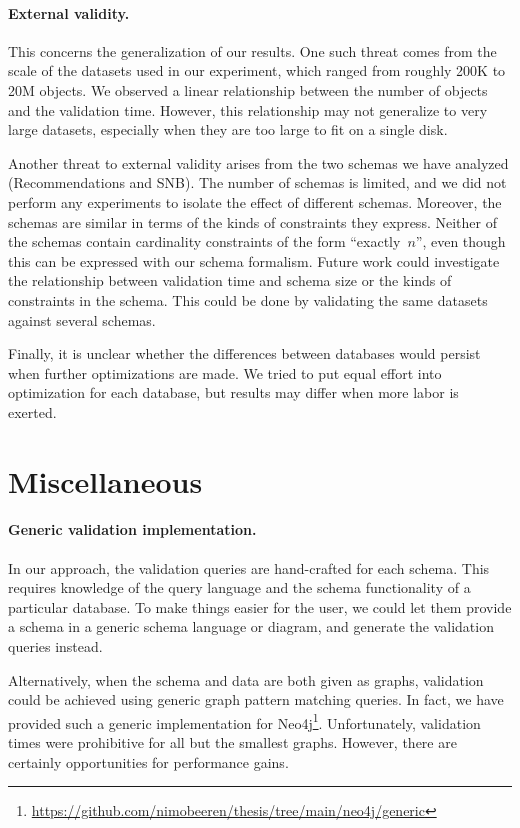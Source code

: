 \documentclass{report}
\theoremstyle{definition}
\begin{document}
\paragraph{External validity.} This concerns the generalization of our results. One such threat comes from the scale of the datasets used in our experiment, which ranged from roughly 200K to 20M objects. We observed a linear relationship between the number of objects and the validation time. However, this relationship may not generalize to very large datasets, especially when they are too large to fit on a single disk.

Another threat to external validity arises from the two schemas we have analyzed (Recommendations and SNB). The number of schemas is limited, and we did not perform any experiments to isolate the effect of different schemas. Moreover, the schemas are similar in terms of the kinds of constraints they express. Neither of the schemas contain cardinality constraints of the form ``exactly~$n$'', even though this can be expressed with our schema formalism. Future work could investigate the relationship between validation time and schema size or the kinds of constraints in the schema. This could be done by validating the same datasets against several schemas.

Finally, it is unclear whether the differences between databases would persist when further optimizations are made. We tried to put equal effort into optimization for each database, but results may differ when more labor is exerted.

\section{Miscellaneous}

\paragraph{Generic validation implementation.} In our approach, the validation queries are hand-crafted for each schema. This requires knowledge of the query language and the schema functionality of a particular database. To make things easier for the user, we could let them provide a schema in a generic schema language or diagram, and generate the validation queries instead.

Alternatively, when the schema and data are both given as graphs, validation could be achieved using generic graph pattern matching queries. In fact, we have provided such a generic implementation for Neo4j\footnote{\url{https://github.com/nimobeeren/thesis/tree/main/neo4j/generic}}. Unfortunately, validation times were prohibitive for all but the smallest graphs. However, there are certainly opportunities for performance gains.
\end{document}

